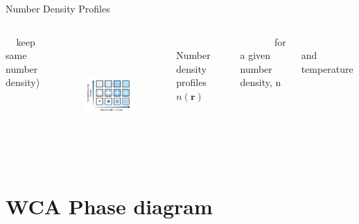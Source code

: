 \documentclass{beamer}
\renewcommand{\vec}[1]{\mathbf{#1}}
\begin{document}
\begin{frame}{Number Density Profiles}
\begin{columns}[t]
\begin{block}{}
\begin{itemize}
                $~~~~~$keep same number density) \normalsize
            \end{itemize}
        \end{block}
    \normalsize
             \vspace{-3em} 
    	    \begin{figure}
               \centering
               \includegraphics[height=4.5cm]{VaryWidthandVacancies}
            \end{figure} 
                \footnotesize
    $~~~~~~~~~~~~~~~~~$Number density profiles $n(\vec r)$ 
  
    $~~~~~~~~~~~~~~~~$for a given number density, n 
    
    $~~~~~~~~~~~~~~~~~~~~~~~~~$and temperature
	\end{columns}
\end{frame}


\section*{WCA Phase diagram}
\end{document}
